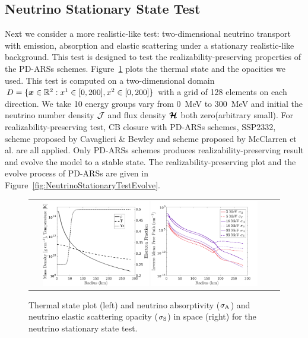 \subsection{Neutrino Stationary State Test} \label{se: Neutrino Stationary State Test}
Next we consider a more realistic-like test: two-dimensional neutrino transport with emission, absorption and elastic scattering under a stationary realistic-like background.
This test is designed to test the realizability-preserving properties of the PD-ARSs schemes.
Figure~\ref{fig:NeutrinoStationaryTestEOS} plots the thermal state and the opacities we used.
This test is computed on a two-dimensional domain $D=\{\boldsymbol{x}\in\mathbb{R}^{2}:x^{1}\in[0,200], x^{2}\in[0,200]\}$ with a grid of 128 elements on each direction.
We take 10 energy groups vary from 0~MeV to 300~MeV and initial the neutrino number density $\mathcal{J}$ and flux density $\boldsymbol{\mathcal{H}}$ both zero(arbitrary small).
For realizability-preserving test, CB closure with PD-ARSs schemes, SSP2332, scheme proposed by Cavaglieri \& Bewley \cite{cavaglieriBewley2015} and scheme proposed by McClarren et al. \cite{mcclarren_etal_2008} are all applied.
Only PD-ARSs schemes produces realizability-preserving result and evolve the model to a stable state.
The realizability-preserving plot and the evolve process of PD-ARSs are given in Figure~\ref{fig:NeutrinoStationaryTestEvolve}. 

\begin{figure}[h]
  \centering
  \begin{tabular}{cc}
    \includegraphics[width=0.45\textwidth]{figures/NStatinaryS_EOS}
    \includegraphics[width=0.45\textwidth]{figures/NSS_Opacities}
  \end{tabular}
   \caption{Thermal state plot (left) and neutrino absorptivity ($\sigma_{{\rm A}}$) and neutrino elastic scattering opacity ($ \sigma_{{\rm S}}$) in space (right) for the neutrino stationary state test.}
   \label{fig:NeutrinoStationaryTestEOS}
\end{figure}

